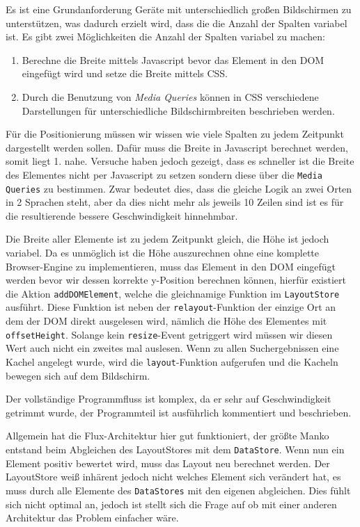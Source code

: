 \documentclass[12pt,twoside]{book}
\begin{document}
Es ist eine Grundanforderung Geräte mit unterschiedlich großen Bildschirmen zu unterstützen, was dadurch erzielt wird, dass die die Anzahl der Spalten variabel ist.
Es gibt zwei Möglichkeiten die Anzahl der Spalten variabel zu machen:

\begin{enumerate}
  \item Berechne die Breite mittels Javascript bevor das Element in den DOM eingefügt wird und setze die Breite mittels CSS.
  \item Durch die Benutzung von \textit{Media Queries} können in CSS verschiedene Darstellungen für unterschiedliche Bildschirmbreiten beschrieben werden.
\end{enumerate}

Für die Positionierung müssen wir wissen wie viele Spalten zu jedem Zeitpunkt dargestellt werden sollen. Dafür muss die Breite in Javascript berechnet werden, somit liegt 1. nahe. Versuche haben jedoch gezeigt, dass es schneller ist die Breite des Elementes nicht per Javascript zu setzen sondern diese über die \texttt{Media Queries} zu bestimmen. Zwar bedeutet dies, dass die gleiche Logik an zwei Orten in 2 Sprachen steht, aber da dies nicht mehr als jeweils 10 Zeilen sind ist es für die resultierende bessere Geschwindigkeit hinnehmbar.

Die Breite aller Elemente ist zu jedem Zeitpunkt gleich, die Höhe ist jedoch variabel. Da es unmöglich ist die Höhe auszurechnen ohne eine komplette Browser-Engine zu implementieren, muss das Element in den DOM eingefügt werden bevor wir dessen korrekte y-Position berechnen können, hierfür existiert die Aktion \texttt{addDOMElement}, welche die gleichnamige Funktion im \texttt{LayoutStore} ausführt. Diese Funktion ist neben der \texttt{relayout}-Funktion der einzige Ort an dem der DOM direkt ausgelesen wird, nämlich die Höhe des Elementes mit \texttt{offsetHeight}. Solange kein \texttt{resize}-Event getriggert wird müssen wir diesen Wert auch nicht ein zweites mal auslesen.
Wenn zu allen Suchergebnissen eine Kachel angelegt wurde, wird die \texttt{layout}-Funktion aufgerufen und die Kacheln bewegen sich auf dem Bildschirm.

Der vollständige Programmfluss ist komplex, da er sehr auf Geschwindigkeit getrimmt wurde, der Programmteil ist ausführlich kommentiert und beschrieben.

Allgemein hat die Flux-Architektur hier gut funktioniert, der größte Manko entstand beim Abgleichen des LayoutStores mit dem \texttt{DataStore}. Wenn nun ein Element positiv bewertet wird, muss das Layout neu berechnet werden. Der LayoutStore weiß inhärent jedoch nicht welches Element sich verändert hat, es muss durch alle Elemente des \texttt{DataStores} mit den eigenen abgleichen. Dies fühlt sich nicht optimal an, jedoch ist stellt sich die Frage auf ob mit einer anderen Architektur das Problem einfacher wäre.
\end{document}
